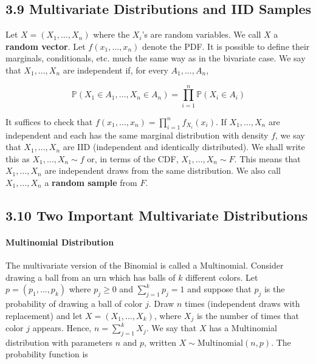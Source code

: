 \subsection{3.9 Multivariate Distributions and IID
Samples}\label{multivariate-distributions-and-iid-samples}

Let \(X = (X_1, \dots, X_n)\) where the \(X_i\)'s are random variables.
We call \(X\) a \textbf{random vector}. Let \(f(x_1, \dots, x_n)\)
denote the PDF. It is possible to define their marginals, conditionals,
etc. much the same way as in the bivariate case. We say that
\(X_1, \dots, X_n\) are independent if, for every \(A_1, \dots, A_n\),

\[ \mathbb{P}(X_1 \in A_1, \dots, X_n \in A_n) = \prod_{i=1}^n \mathbb{P}(X_i \in A_i) \]

It suffices to check that
\(f(x_1, \dots, x_n) = \prod_{i=1}^n f_{X_i}(x_i)\). If
\(X_1, \dots, X_n\) are independent and each has the same marginal
distribution with density \(f\), we say that \(X_1, \dots, X_n\) are IID
(independent and identically distributed). We shall write this as
\(X_1, \dots, X_n \sim f\) or, in terms of the CDF,
\(X_1, \dots, X_n \sim F\). This means that \(X_1, \dots, X_n\) are
independent draws from the same distribution. We also call
\(X_1, \dots, X_n\) a \textbf{random sample} from \(F\).

\subsection{3.10 Two Important Multivariate
Distributions}\label{two-important-multivariate-distributions}

\paragraph{Multinomial Distribution}\label{multinomial-distribution}

The multivariate version of the Binomial is called a Multinomial.
Consider drawing a ball from an urn which has balls of \(k\) different
colors. Let \(p = (p_1, \dots, p_k)\) where \(p_j \geq 0\) and
\(\sum_{j=1}^k p_j = 1\) and suppose that \(p_j\) is the probability of
drawing a ball of color \(j\). Draw \(n\) times (independent draws with
replacement) and let \(X = (X_1, \dots, X_k)\), where \(X_j\) is the
number of times that color \(j\) appears. Hence,
\(n = \sum_{j=1}^k X_j\). We say that \(X\) has a Multinomial
distribution with parameters \(n\) and \(p\), written
\(X \sim \text{Multinomial}(n, p)\). The probability function is

